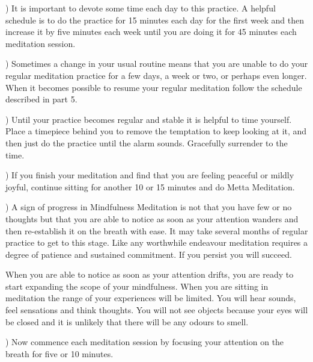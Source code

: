 \documentclass[10pt, openright]{book}
\begin{document}
\vspace* {1em}) It is important to devote some time each day to this practice. A helpful schedule is to do the practice for 15 minutes each day for the first week and then increase it by five minutes each week until you are doing it for 45 minutes each meditation session.


\vspace* {1em}) Sometimes a change in your usual routine means that you are unable to do your regular meditation practice for a few days, a week or two, or perhaps even longer. When it becomes possible to resume your regular meditation follow the schedule described in part 5.


\vspace* {1em}) Until your practice becomes regular and stable it is helpful to time yourself. Place a timepiece behind you to remove the temptation to keep looking at it, and then just do the practice until the alarm sounds. Gracefully surrender to the time.


\vspace* {1em}) If you finish your meditation and find that you are feeling peaceful or mildly joyful, continue sitting for another 10 or 15 minutes and do Metta Meditation.


\vspace* {1em}) A sign of progress in Mindfulness Meditation is not that you have few or no thoughts but that you are able to notice as soon as your attention wanders and then re-establish it on the breath with ease. It may take several months of regular practice to get to this stage. Like any worthwhile endeavour meditation requires a degree of patience and sustained commitment. If you persist you will succeed.


When you are able to notice as soon as your attention drifts, you are ready to start expanding the scope of your mindfulness. When you are sitting in meditation the range of your experiences will be limited. You will hear sounds, feel sensations and think thoughts. You will not see objects because your eyes will be closed and it is unlikely that there will be any odours to smell.


\vspace* {1em}) Now commence each meditation session by focusing your attention on the breath for five or 10 minutes.
\end{document}
